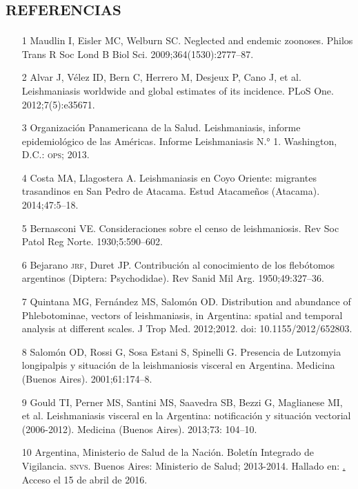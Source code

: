 \documentclass{article}
\begin{document}
\section*{\textsc{referencias}}
\begin{itemize}

\item[1] Maudlin I, Eisler MC, Welburn SC. Neglected and endemic zoonoses.
Philos Trans R Soc Lond B Biol Sci. 2009;364(1530):2777–87.

\item[2] Alvar J, Vélez ID, Bern C, Herrero M, Desjeux P, Cano J, et al.
Leishmaniasis worldwide and global estimates of its incidence. PLoS One.
2012;7(5):e35671.

\item[3] Organización Panamericana de la Salud. Leishmaniasis, informe
epidemiológico de las Américas. Informe Leishmaniasis N.° 1. Washington, D.C.:
\textsc{ops}; 2013.

\item[4] Costa MA, Llagostera A. Leishmaniasis en Coyo Oriente: migrantes
trasandinos en San Pedro de Atacama. Estud Atacameños (Atacama). 2014;47:5–18.

\item[5] Bernasconi VE. Consideraciones sobre el censo de leishmaniosis. Rev
Soc Patol Reg Norte. 1930;5:590–602.

\item[6] Bejarano \textsc{jrf}, Duret JP. Contribución al conocimiento de los
flebótomos argentinos (Diptera: Psychodidae). Rev Sanid Mil Arg. 1950;49:327–36.

\item[7] Quintana MG, Fernández MS, Salomón OD. Distribution and abundance of
Phlebotominae, vectors of leishmaniasis, in Argentina: spatial and temporal
analysis at different scales. J Trop Med. 2012;2012. doi: 10.1155/2012/652803.

\item[8] Salomón OD, Rossi G, Sosa Estani S, Spinelli G. Presencia de
Lutzomyia longipalpis y situación de la leishmaniosis visceral en Argentina.
Medicina (Buenos Aires). 2001;61:174–8.

\item[9] Gould TI, Perner MS, Santini MS, Saavedra SB, Bezzi G, Maglianese MI,
et al. Leishmaniasis visceral en la Argentina: notificación y situación
vectorial (2006-2012). Medicina (Buenos Aires). 2013;73: 104–10.

\item[10] Argentina, Ministerio de Salud de la Nación. Boletín Integrado de
Vigilancia. \textsc{snvs}. Buenos Aires: Ministerio de Salud; 2013-2014. Hallado en:
\href{http://www.msal.gov.ar/index.php/home/boletin-integrado-de-vigilancia}.
Acceso el 15 de abril de 2016.


\end{itemize}
\end{document}
